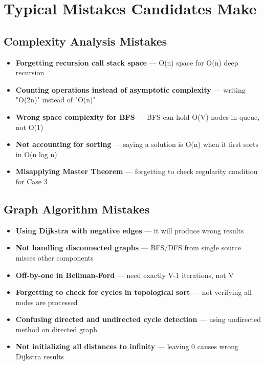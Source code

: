 \documentclass[11pt]{article}
\providecommand{\tightlist}{\setlength{\itemsep}{1pt}\setlength{\parskip}{0pt}}
\begin{document}
\section{Typical Mistakes Candidates Make}\label{typical-mistakes-candidates-make}

\subsection{Complexity Analysis Mistakes}\label{complexity-analysis-mistakes}

\begin{itemize}
\tightlist
\item
  \textbf{Forgetting recursion call stack space} --- O(n) space for O(n) deep recursion
\item
  \textbf{Counting operations instead of asymptotic complexity} --- writing "O(2n)" instead of "O(n)"
\item
  \textbf{Wrong space complexity for BFS} --- BFS can hold O(V) nodes in queue, not O(1)
\item
  \textbf{Not accounting for sorting} --- saying a solution is O(n) when it first sorts in O(n log n)
\item
  \textbf{Misapplying Master Theorem} --- forgetting to check regularity condition for Case 3
\end{itemize}

\subsection{Graph Algorithm Mistakes}\label{graph-algorithm-mistakes}

\begin{itemize}
\tightlist
\item
  \textbf{Using Dijkstra with negative edges} --- it will produce wrong results
\item
  \textbf{Not handling disconnected graphs} --- BFS/DFS from single source misses other components
\item
  \textbf{Off-by-one in Bellman-Ford} --- need exactly V-1 iterations, not V
\item
  \textbf{Forgetting to check for cycles in topological sort} --- not verifying all nodes are processed
\item
  \textbf{Confusing directed and undirected cycle detection} --- using undirected method on directed graph
\item
  \textbf{Not initializing all distances to infinity} --- leaving 0 causes wrong Dijkstra results
\end{itemize}
\end{document}
